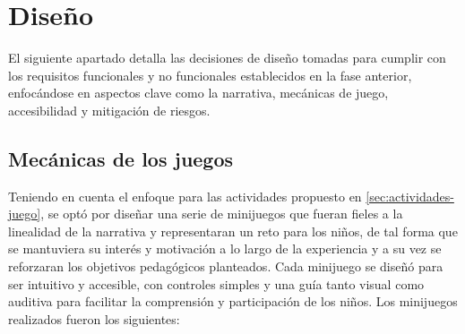 \section{Diseño} \label{sec:diseno}

El siguiente apartado detalla las decisiones de diseño tomadas para cumplir con los requisitos funcionales y no funcionales establecidos en la fase anterior, enfocándose en aspectos clave como la narrativa, mecánicas de juego, accesibilidad y mitigación de riesgos.

\subsection{Mecánicas de los juegos} \label{sec:mecanicas-juegos}
Teniendo en cuenta el enfoque para las actividades propuesto en \ref{sec:actividades-juego}, se optó por diseñar una serie de minijuegos que fueran fieles a la linealidad de la narrativa y representaran un reto para los niños, de tal forma que se mantuviera su interés y motivación a lo largo de la experiencia
y a su vez se reforzaran los objetivos pedagógicos planteados. Cada minijuego se diseñó para ser intuitivo y accesible, con controles simples y una guía tanto visual como auditiva para facilitar la comprensión y participación de los niños. Los minijuegos realizados fueron los siguientes:
